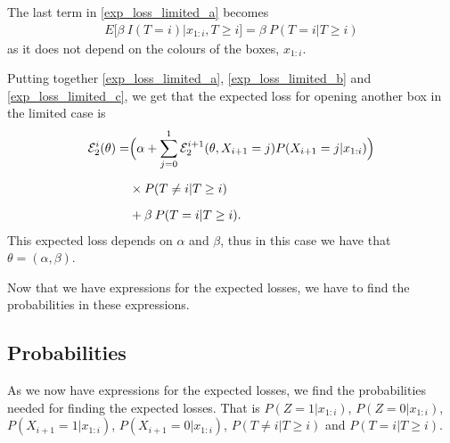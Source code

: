 The last term in \eqref{exp_loss_limited_a} becomes
\begin{equation}
\label{exp_loss_limited_c}
    \begin{aligned}
        E\big[ \beta \: I(T=i)|x_{1:i}, T\geq i\big] 
        = \beta \: P(T=i|T\geq i)
    \end{aligned}
\end{equation}
as it does not depend on the colours of the boxes, $x_{1:i}$.

Putting together \eqref{exp_loss_limited_a}, \eqref{exp_loss_limited_b} and \eqref{exp_loss_limited_c}, we get that the expected loss for opening another box in the limited case is
\begin{equation}
\label{exp_loss_limited_final}
    \begin{aligned}
        \mathcal{E}^i_{2}(\theta) 
        =& \Big( \alpha + \sum_{j=0}^1 \mathcal{E}^{i+1}_{2}(\theta,X_{i+1}=j) P(X_{i+1}=j|x_{1:i}) \Big) \\[6pt]
        &\times 
        P(T \neq i|T\geq i)\\[6pt]
        &+ \beta \: P(T=i|T\geq i).
    \end{aligned}
\end{equation}
This expected loss depends on $\alpha$ and $\beta$, thus in this case we have that $\theta = (\alpha,\beta)$.

Now that we have expressions for the expected losses, we have to find the probabilities in these expressions. 

\subsection{Probabilities}
As we now have expressions for the expected losses, we find the probabilities needed for finding the expected losses. That is $P(Z=1|x_{1:i})$, $P(Z=0|x_{1:i})$, $P(X_{i+1}=1|x_{1:i})$, $P(X_{i+1}=0|x_{1:i})$, $P(T\neq i|T\geq i)$ and $P(T=i|T\geq i)$.

